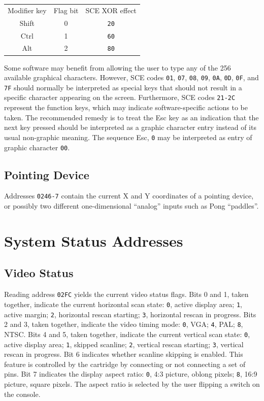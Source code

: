 \documentclass[12pt]{{memoir}}
\begin{document}
\begin{center}\begin{tabular}{ccc}
Modifier key & Flag bit & SCE XOR effect \\
\textsf{Shift} & 0 & \texttt{20} \\
\textsf{Ctrl} & 1 & \texttt{60} \\
\textsf{Alt} & 2 & \texttt{80} \\
\end{tabular}\end{center}

Some software may benefit from allowing the user to type any of the 256 available graphical characters. However, SCE codes \texttt{01}, \texttt{07}, \texttt{08}, \texttt{09}, \texttt{0A}, \texttt{0D}, \texttt{0F}, and \texttt{7F} should normally be interpreted as special keys that should not result in a specific character appearing on the screen. Furthermore, SCE codes \texttt{21-2C} represent the function keys, which may indicate software-specific actions to be taken. The recommended remedy is to treat the \textsf{Esc} key as an indication that the next key pressed should be interpreted as a graphic character entry instead of its usual non-graphic meaning. The sequence \textsf{Esc}, \texttt{0} may be interpreted as entry of graphic character \texttt{00}.

\subsection{Pointing Device}

Addresses \texttt{0246-7} contain the current X and Y coordinates of a pointing device, or possibly two different one-dimensional ``analog'' inputs such as Pong ``paddles''.

\section{System Status Addresses}
\label{sec:otherinput}

\subsection{Video Status}
\label{ss:videostatusbyte}

Reading address \texttt{02FC} yields the current video status flags. Bits 0 and 1, taken together, indicate the current horizontal scan state: \texttt{0}, active display area; \texttt{1}, active margin; \texttt{2}, horizontal rescan starting; \texttt{3}, horizontal rescan in progress. Bits 2 and 3, taken together, indicate the video timing mode: \texttt{0}, VGA; \texttt{4}, PAL; \texttt{8}, NTSC. Bits 4 and 5, taken together, indicate the current vertical scan state: \texttt{0}, active display area; \texttt{1}, skipped scanline; \texttt{2}, vertical rescan starting; \texttt{3}, vertical rescan in progress. Bit 6 indicates whether scanline skipping is enabled. This feature is controlled by the cartridge by connecting or not connecting a set of pins. Bit 7 indicates the display aspect ratio: \texttt{0}, 4:3 picture, oblong pixels; \texttt{8}, 16:9 picture, square pixels. The aspect ratio is selected by the user flipping a switch on the console.
\end{document}
